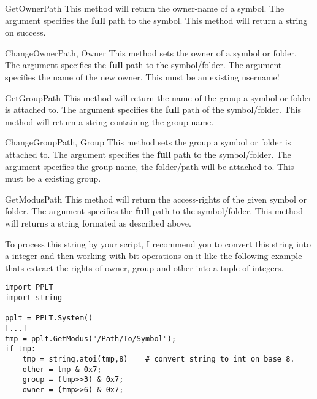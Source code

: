 \begin{methoddesc}[System]{GetOwner}{Path}
This method will return the owner-name of a symbol. The argument
 specifies the \textbf{full} path to the symbol. This method will
return a string on success.
\end{methoddesc}


\begin{methoddesc}[System]{ChangeOwner}{Path, Owner}
This method sets the owner of a symbol or folder. The argument  
specifies the \textbf{full} path to the symbol/folder. The argument 
 specifies the name of the new owner. This must be an existing 
username! 
\end{methoddesc}


\begin{methoddesc}[System]{GetGroup}{Path}
This method will return the name of the group a symbol or folder is attached 
to. The argument  specifies the \textbf{full} path of the 
symbol/folder. This method will return a string containing the group-name.
\end{methoddesc}


\begin{methoddesc}[System]{ChangeGroup}{Path, Group}
This method sets the group a symbol or folder is attached to. The argument
 specifies the \textbf{full} path to the symbol/folder. The argument
 specifies the group-name, the folder/path will be attached to. This
must be a existing group.
\end{methoddesc}


\begin{methoddesc}[System]{GetModus}{Path}
This method will return the access-rights of the given symbol or folder.
The argument  specifies the \textbf{full} path to the symbol/folder.
This method will returns a string formated as described above.

To process this string by your script, I recommend you to convert this string 
into a integer and then working with bit operations on it like the following 
example thats extract the rights of owner, group and other into a tuple of 
integers.
\begin{verbatim}
import PPLT
import string

pplt = PPLT.System()
[...]
tmp = pplt.GetModus("/Path/To/Symbol");
if tmp:
    tmp = string.atoi(tmp,8)    # convert string to int on base 8.
    other = tmp & 0x7;
    group = (tmp>>3) & 0x7;
    owner = (tmp>>6) & 0x7;
\end{verbatim}    
\end{methoddesc}


